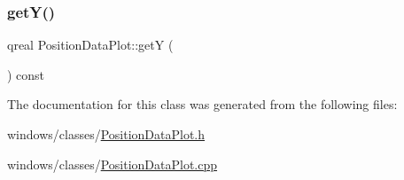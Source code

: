 \mbox{\label{class_position_data_plot_ab678bdd19b9be8eadefa35f58a770704}} 
\subsubsection{\texorpdfstring{get\+Y()}{getY()}}
{\footnotesize\ttfamily qreal Position\+Data\+Plot\+::getY (\begin{DoxyParamCaption}{ }\end{DoxyParamCaption}) const}



The documentation for this class was generated from the following files\+:\begin{DoxyCompactItemize}
\item 
windows/classes/\hyperlink{_position_data_plot_8h}{Position\+Data\+Plot.\+h}\item 
windows/classes/\hyperlink{_position_data_plot_8cpp}{Position\+Data\+Plot.\+cpp}\end{DoxyCompactItemize}

